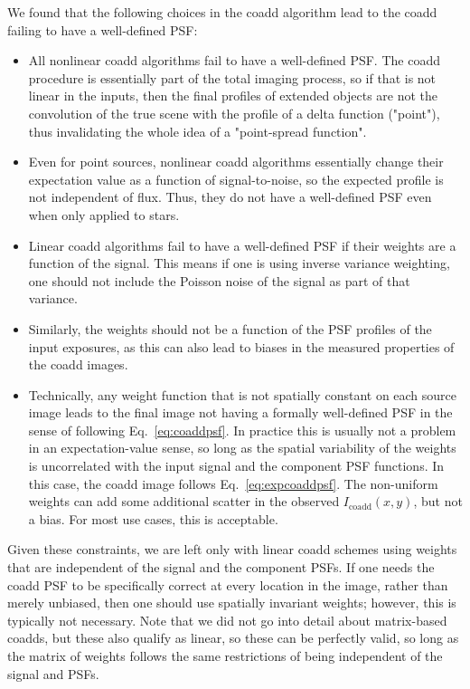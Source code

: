 \documentclass{aastex63}
\begin{document}
We found that the following choices in the coadd algorithm lead to the coadd failing to
have a well-defined PSF:
\begin{itemize}
    \item All nonlinear coadd algorithms fail to have a well-defined PSF.  The coadd procedure is essentially part of the total imaging process, so if that is not linear in the inputs, then the final profiles of extended objects are not the convolution of the true scene with the profile of a delta function ("point"), thus invalidating the whole idea of a "point-spread function".
    \item Even for point sources, nonlinear coadd algorithms essentially change their expectation value as a function of signal-to-noise, so the expected profile is not independent of flux.  Thus, they do not have a well-defined PSF even when only applied to stars.
    \item Linear coadd algorithms fail to have a well-defined PSF if their weights are a function of the signal.  This means if one is using inverse variance weighting, one should not include the Poisson noise of the signal as part of that variance.
    \item Similarly, the weights should not be a function of the PSF profiles of the input exposures, as this can also lead to biases in the measured properties of the coadd images.
    \item Technically, any weight function that is not spatially constant on each source image leads to the final image not having a formally well-defined PSF in the sense of following Eq.~\eqref{eq:coaddpsf}.  In practice this is usually not a problem in an expectation-value sense, so long as the spatial variability of the weights is uncorrelated with the input signal and the component PSF functions.  In this case, the coadd image follows Eq.~\eqref{eq:expcoaddpsf}. The non-uniform weights can add some additional scatter in the observed $I_\mathrm{coadd}(x,y)$, but not a bias.  For most use cases, this is acceptable.
\end{itemize}

Given these constraints, we are left only with linear coadd schemes using weights that are independent of the signal and the component PSFs.  If one needs the coadd PSF to be specifically correct at every location in the image, rather than merely unbiased, then one should use spatially invariant weights; however, this is typically not necessary. Note that we did not go into detail about matrix-based coadds, but these also qualify as linear, so these can be perfectly valid, so long as the matrix of weights follows the same restrictions of being independent of the signal and PSFs.
\end{document}
